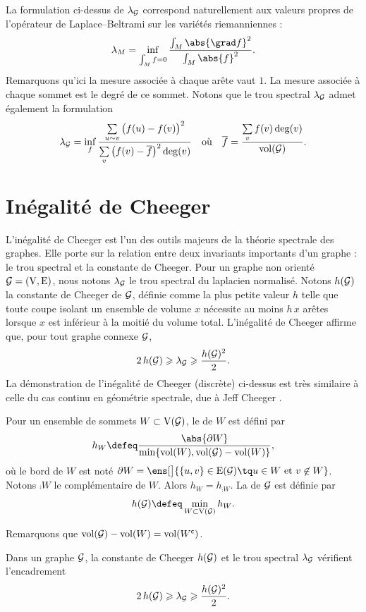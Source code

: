La formulation ci-dessus de $\lambda_{\mathcal{G}}$ correspond naturellement aux valeurs propres de l'opérateur de Laplace--Beltrami sur les variétés riemanniennes :
\[
\lambda_M = \inf_{\int_M f = 0} \frac{\int_M \abs{\grad f}^2}{\int_M \abs{f}^2}.
\]
Remarquons qu'ici la mesure associée à chaque arête vaut $1$. La mesure associée à chaque sommet est le degré de ce sommet. Notons que le trou spectral $\lambda_{\mathcal{G}}$ admet également la formulation
\[
\lambda_{\mathcal{G}} = \inf_f \frac{\sum\limits_{u \sim v} \big( f(u) - f(v) \big)^2}{\sum\limits_v \big( f(v) - \overline{f} \big)^2 \operatorname{deg}(v)}
\quad
\text{où}
\quad
\overline{f} = \displaystyle\frac{\sum\limits_v f(v) \operatorname{deg}(v)}{\operatorname{vol}(\mathcal{G})}.
\]

\section{Inégalité de Cheeger} \label{sec:the_cheeger_inequality}

L'inégalité de Cheeger est l'un des outils majeurs de la théorie spectrale des graphes. Elle porte sur la relation entre deux invariants importants d'un graphe : le trou spectral et la constante de Cheeger. Pour un graphe non orienté $\mathcal{G} = (\mathrm{V}, \mathrm{E})$, nous notons $\lambda_{\mathcal{G}}$ le trou spectral du laplacien normalisé. Notons $h(\mathcal{G})$ la constante de Cheeger de $\mathcal{G}$, définie comme la plus petite valeur $h$ telle que toute coupe isolant un ensemble de volume $x$ nécessite au moins $h \, x$ arêtes lorsque $x$ est inférieur à la moitié du volume total. L'inégalité de Cheeger affirme que, pour tout graphe connexe $\mathcal{G}$,
\[
2 \, h(\mathcal{G}) \geqslant \lambda_{\mathcal{G}} \geqslant \frac{h(\mathcal{G})^2}{2}.
\]
La démonstration de l'inégalité de Cheeger (discrète) ci-dessus est très similaire à celle du cas continu en géométrie spectrale, due à Jeff Cheeger \cite{gunning_lower_2015}.

\begin{defi}
Pour un ensemble de sommets $W \subset \mathrm{V}(\mathcal{G})$, le  de $W$ est défini par
\begin{equation}
h_W \defeq \frac{\abs{\partial W}}{\min\{ \vol(W), \vol(\graphe) - \vol(W) \}},
\end{equation}
où le bord de $W$ est noté $\partial W = \ens[\big]{ \{u, v\} \in \edges(\graphe) \tq u \in W \text{ et } v \not\in W }$. Notons $\comp{W}$ le complémentaire de $W$. Alors $h_W = h_{\comp{W}}$. La  de $\mathcal{G}$ est définie par
\begin{equation}
h(\graphe) \defeq \min_{W \subset \vertices(\graphe)} h_W.
\end{equation}
\end{defi}

\begin{remarque}
Remarquons que $\operatorname{vol}(\mathcal{G}) - \operatorname{vol}(W) = \operatorname{vol}(W^{\mathsf{c}})$.
\end{remarque}

\begin{theo}
Dans un graphe $\mathcal{G}$, la constante de Cheeger $h(\mathcal{G})$ et le trou spectral $\lambda_{\mathcal{G}}$ vérifient l'encadrement
\[
2 \, h(\mathcal{G}) \geqslant \lambda_{\mathcal{G}} \geqslant \frac{h(\mathcal{G})^2}{2}.
\]
\end{theo}